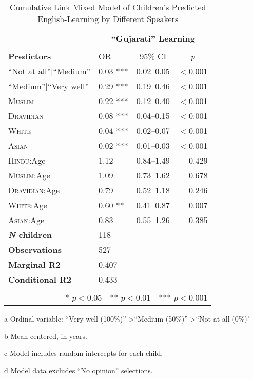 \begin{table*}[t]
\small
\caption{Cumulative Link Mixed Model of Children's Predicted English-Learning by Different Speakers}\label{tab:wealth-ord}
    \centering
    \vspace{5pt}
\begin{threeparttable}
\begin{tabular}{llcr}
 \toprule
& \multicolumn{3}{c}{\textbf{``Gujarati'' Learning}\tnote{a}} \\
\cline{2-4} \\[-.75em]
\textbf{Predictors} & {OR} & {95\% CI} & \multicolumn{1}{c}{\textit{p}} \\ 
\midrule
  \hline
``Not at all''$|$``Medium'' & 0.03 *** & 0.02--0.05 & $<$0.001 \\ 
``Medium''$|$``Very well'' & 0.29 *** & 0.19--0.46 & $<$0.001 \\ 
  \textsc{Muslim} & 0.22 *** & 0.12--0.40 & $<$0.001 \\ 
  \textsc{Dravidian} & 0.08 *** & 0.04--0.15 & $<$0.001 \\ 
  \textsc{White} & 0.04 *** & 0.02--0.07 & $<$0.001 \\ 
  \textsc{Asian} & 0.02 *** & 0.01--0.03 & $<$0.001 \\ 
\textsc{Hindu}:Age\tnote{b}  & 1.12 & 0.84--1.49 & 0.429 \\ 
  \textsc{Muslim}:Age & 1.09 & 0.73--1.62 & 0.678 \\ 
  \textsc{Dravidian}:Age & 0.79 & 0.52--1.18 & 0.246 \\ 
  \textsc{White}:Age & 0.60 ** & 0.41--0.87 & 0.007 \\ 
  \textsc{Asian}:Age & 0.83 & 0.55--1.26 & 0.385 \\ 
\midrule
\bfseries{\textit{N} children}\tnote{c} & 118 &  &  \\ 
\textbf{Observations}\tnote{d} & 527 &  &  \\ 
 \textbf{Marginal R2} & 0.407 &&\\
 \textbf{Conditional R2} & 0.433 &  &  \\ 
\bottomrule\\[-.75em]
\multicolumn{4}{r}{* $p<0.05$~~** $p<0.01$~~*** $p<0.001$}\\
\end{tabular}
\begin{tablenotes}[flushleft]
    \item[a] Ordinal variable: ``Very well (100\%)'' \textgreater ``Medium (50\%)'' \textgreater ``Not at all (0\%)'
    \item[b] Mean-centered, in years.
    \item[c] Model includes random intercepts for each child.
    \item[d] Model data excludes ``No opinion'' selections. 
\end{tablenotes}
\end{threeparttable}
\end{table*}
